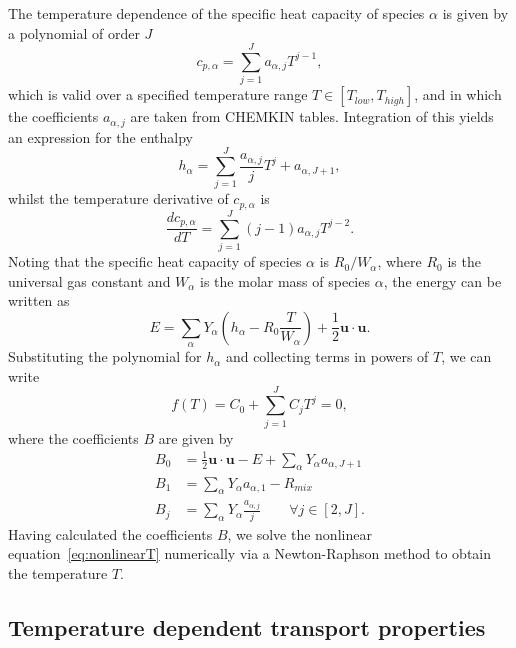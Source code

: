 \documentclass[notitlepage]{article}
\begin{document}
The temperature dependence of the specific heat capacity of species $\alpha$ is given by a polynomial of order $J$
\begin{equation}c_{p,\alpha}=\displaystyle\sum_{j=1}^{J}a_{\alpha,j}T^{j-1},\end{equation}
which is valid over a specified temperature range $T\in\left[T_{low},T_{high}\right]$, and in which the coefficients $a_{\alpha,j}$ are taken from CHEMKIN tables. Integration of this yields an expression for the enthalpy
\begin{equation}h_{\alpha}=\displaystyle\sum_{j=1}^{J}\frac{a_{\alpha,j}}{j}T^{j} + a_{\alpha,J+1},\end{equation}
whilst the temperature derivative of $c_{p,\alpha}$ is
\begin{equation}\frac{dc_{p,\alpha}}{dT}=\displaystyle\sum_{j=1}^{J}\left(j-1\right)a_{\alpha,j}T^{j-2}.\end{equation}
Noting that the specific heat capacity of species $\alpha$ is $R_{0}/W_{\alpha}$, where $R_{0}$ is the universal gas constant and $W_{\alpha}$ is the molar mass of species $\alpha$, the energy can be written as
\begin{equation}E=\displaystyle\sum_{\alpha}Y_{\alpha}\left(h_{\alpha}-R_{0}\frac{T}{W_{\alpha}}\right)+\frac{1}{2}\bm{u}\cdot\bm{u}.\end{equation}
Substituting the polynomial for $h_{\alpha}$ and collecting terms in powers of $T$, we can write
\begin{equation}f\left(T\right)=C_{0}+\displaystyle\sum_{j=1}^{J}C_{j}T^{j}=0,\label{eq:nonlinearT}\end{equation}
where the coefficients $B$ are given by
\begin{subequations}\begin{align}
B_{0}&=\frac{1}{2}\bm{u}\cdot\bm{u}-E+\displaystyle\sum_{\alpha}Y_{\alpha}a_{\alpha,J+1}\\
B_{1}&=\displaystyle\sum_{\alpha}Y_{\alpha}a_{\alpha,1} - R_{mix}\\
B_{j}&=\displaystyle\sum_{\alpha}Y_{\alpha}\frac{a_{\alpha,j}}{j}\qquad\forall{j}\in\left[2,J\right].\end{align}\end{subequations}
Having calculated the coefficients $B$, we solve the nonlinear equation~\eqref{eq:nonlinearT} numerically via a Newton-Raphson method to obtain the temperature $T$.


\subsection{Temperature dependent transport properties}
\end{document}
